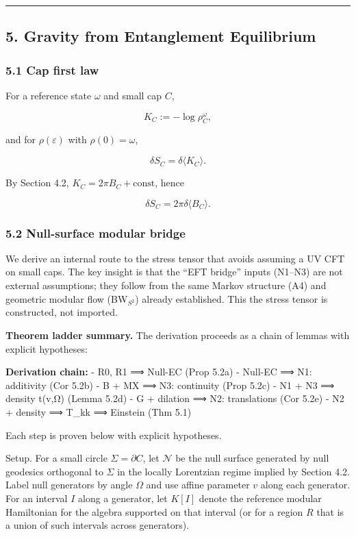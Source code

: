 \documentclass[
]{article}
\begin{document}
\begin{center}\rule{0.5\linewidth}{0.5pt}\end{center}

\subsection{5. Gravity from Entanglement
Equilibrium}\label{gravity-from-entanglement-equilibrium}

\subsubsection{5.1 Cap first law}\label{cap-first-law}

For a reference state \(\omega\) and small cap \(C\),

\[
K_C := -\log \rho_C^{\omega},
\]

and for \(\rho(\varepsilon)\) with \(\rho(0)=\omega\),

\[
\delta S_C = \delta \langle K_C \rangle.
\]

By Section 4.2, \(K_C = 2\pi B_C + \text{const}\), hence

\[
\delta S_C = 2 \pi \delta \langle B_C \rangle.
\]

\subsubsection{5.2 Null-surface modular
bridge}\label{null-surface-modular-bridge}

We derive an internal route to the stress tensor that avoids assuming a
UV CFT on small caps. The key insight is that the ``EFT bridge'' inputs
(N1--N3) are not external assumptions; they follow from the same Markov
structure (A4) and geometric modular flow (BW\(_{S^2}\)) already
established. This the stress tensor is constructed, not imported.

\textbf{Theorem ladder summary.} The derivation proceeds as a chain of
lemmas with explicit hypotheses:

\textbf{Derivation chain:} - R0, R1 ⟹ Null-EC (Prop 5.2a) - Null-EC ⟹
N1: additivity (Cor 5.2b) - B + MX ⟹ N3: continuity (Prop 5.2c) - N1 +
N3 ⟹ density t(v,Ω) (Lemma 5.2d) - G + dilation ⟹ N2: translations (Cor
5.2e) - N2 + density ⟹ T\_kk ⟹ Einstein (Thm 5.1)

Each step is proven below with explicit hypotheses.

Setup. For a small circle \(\Sigma = \partial C\), let \(\mathcal N\) be
the null surface generated by null geodesics orthogonal to \(\Sigma\) in
the locally Lorentzian regime implied by Section 4.2. Label null
generators by angle \(\Omega\) and use affine parameter \(v\) along each
generator. For an interval \(I\) along a generator, let \(K[I]\) denote
the reference modular Hamiltonian for the algebra supported on that
interval (or for a region \(R\) that is a union of such intervals across
generators).
\end{document}

